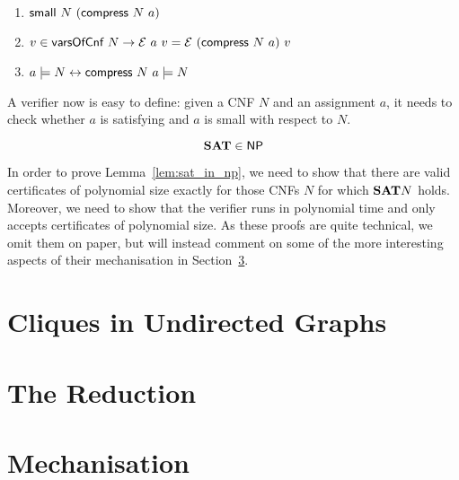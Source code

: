 \begin{lemma}\leavevmode
  \begin{enumerate}
    \item $\textsf{small}~N~(\textsf{compress}~N~a)$
    \item $v \in \textsf{varsOfCnf}~N \rightarrow \mathcal{E}~a~v = \mathcal{E}~(\textsf{compress}~N~a)~v$
    \item $a \models N \leftrightarrow \textsf{compress}~N~a \models N$
  \end{enumerate}
\end{lemma}

A verifier now is easy to define: given a CNF $N$ and an assignment $a$, it needs to check whether $a$ is satisfying and $a$ is small with respect to $N$. 

\begin{lemma}[\SAT{} is in \NP{}]\label{lem:sat_in_np}
  \[\textbf{SAT}{} \in \textsf{NP}{} \]
\end{lemma}

In order to prove Lemma~\ref{lem:sat_in_np}, we need to show that there are valid certificates of polynomial size exactly for those CNFs $N$ for which $\textbf{SAT}{} N$ holds. 
Moreover, we need to show that the verifier runs in polynomial time and only accepts certificates of polynomial size. 
As these proofs are quite technical, we omit them on paper, but will instead comment on some of the more interesting aspects of their mechanisation in Section~\ref{sec:technical_mechanisation}.

\section{Cliques in Undirected Graphs}

\section{The Reduction}

\section{Mechanisation}\label{sec:technical_mechanisation}
